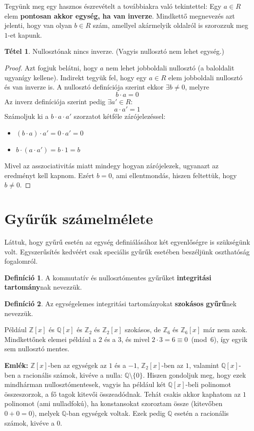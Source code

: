 \documentclass[12pt]{book}
\theoremstyle{plain} %
\theoremstyle{definition} %
\newtheorem{defi/}{Definíció}[section]
\newenvironment{defi}
  {\renewcommand{\qedsymbol}{$\clubsuit$}%
   \pushQED{\qed}\begin{defi/}}
  {\popQED\end{defi/}}
\newtheorem{theo/}{Tétel}[section]
\newenvironment{theo}
  {\renewcommand{\qedsymbol}{$\clubsuit$}%
   \pushQED{\qed}\begin{theo/}}
  {\popQED\end{theo/}}
\theoremstyle{remark}
\renewcommand\qedsymbol{$\blacksquare$}
\numberwithin{equation}{section}  %
\begin{document}
	Tegyünk meg egy hasznos észrevételt a továbbiakra való tekintettel: Egy $a\in R$ elem \textbf{pontosan akkor egység, ha van inverze}. Mindkettő megnevezés azt jelenti, hogy van olyan $b\in R$ szám, amellyel akármelyik oldalról is szorozzuk meg $1$-et kapunk.
	\begin{theo}
		Nullosztónak nincs inverze. (Vagyis nullosztó nem lehet egység.)
	\end{theo}
	\begin{proof}
		Azt fogjuk belátni, hogy $a$ nem lehet jobboldali nullosztó (a baloldalit ugyanígy kellene). Indirekt tegyük fel, hogy egy $a\in R$ elem jobboldali nullosztó és van inverze is. A nullosztó definíciója szerint ekkor $\exists b\neq 0$, melyre
		\[ b\cdot a = 0 \]
		Az inverz definíciója szerint pedig $\exists a'\in R\colon$
		\[ a\cdot a' = 1 \]
		Számoljuk ki a $b\cdot a \cdot a'$ szorzatot kétféle zárójelezéssel:
		\begin{itemize}
			\item $(b\cdot a) \cdot a' = 0\cdot a' = 0$
			\item $b\cdot (a\cdot a') = b\cdot 1 = b$
		\end{itemize}
		Mivel az asszociativitás miatt mindegy hogyan zárójelezek, ugyanazt az eredményt kell kapnom. Ezért $b=0$, ami ellentmondás, hiszen feltettük, hogy $b\neq 0$.
	\end{proof}
	
	\section{Gyűrűk számelmélete}
	Láttuk, hogy gyűrű esetén az egység definiálásához két egyenlőségre is szükségünk volt. Egyszerűsítés kedvéért csak speciális gyűrűk esetében beszéljünk oszthatóság fogalomról.
	\begin{defi}
		A kommutatív és nullosztómentes gyűrűket \textbf{integritási tartomány}nak nevezzük.
	\end{defi}
	\begin{defi}
		Az egységelemes integritási tartományokat \textbf{szokásos gyűrű}nek nevezzük.
	\end{defi}
	Például $\mathbb{Z}[x]$ és $\mathbb{Q}[x]$ és $\mathbb{Z}_2$ és $\mathbb{Z}_2[x]$ szokásos, de $\mathbb{Z}_6$ és $\mathbb{Z}_6[x]$ már nem azok. Mindkettőnek elemei például a $2$ és a $3$, és mivel $2\cdot 3 = 6 \equiv 0$~(mod~6), így egyik sem nullosztó mentes.
	
	\textbf{Emlék: }$\mathbb{Z}[x]$-ben az egységek az $1$ és a $-1$, $\mathbb{Z}_2[x]$-ben az $1$, valamint $\mathbb{Q}[x]$-ben a racionális számok, kivéve a nulla: $\mathbb{Q}\setminus \{0\}$. Hiszen gondoljuk meg, hogy ezek mindhárman nullosztómentesek, vagyis ha például két $\mathbb{Q}[x]$-beli polinomot összeszorzok, a fő tagok kitevői összeadódnak. Tehát csakis akkor kaphatom az $1$ polinomot (ami nulladfokú), ha konstansokat szoroztam össze (kitevőben $0+0=0$), melyek $\mathbb{Q}$-ban egységek voltak. Ezek pedig $\mathbb{Q}$ esetén a racionális számok, kivéve a $0$.
	
\end{document}

